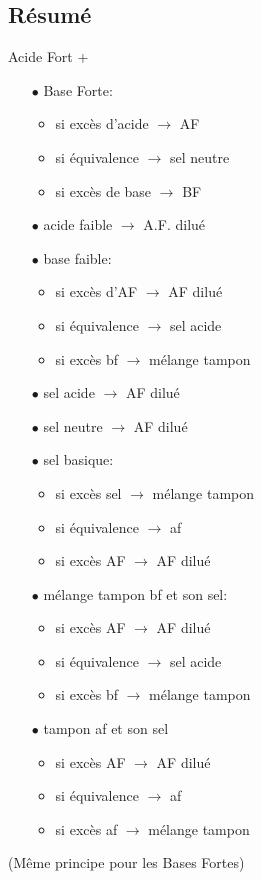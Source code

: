 \documentclass[11pt,a4paper,french]{article}
\begin{document}
\subsection{Résumé}
Acide Fort +
\begin{itemize}
\item[$\bullet$] Base Forte:
	\begin{itemize}
	\item si excès d'acide $\rightarrow$ AF
	\item si équivalence $\rightarrow$ sel neutre
	\item si excès de base $\rightarrow$ BF
	\end{itemize}
\item[$\bullet$] acide faible $\rightarrow$ A.F. dilué
\item[$\bullet$] base faible:
	\begin{itemize}
	\item si excès d'AF $\rightarrow$ AF dilué
	\item si équivalence $\rightarrow$ sel acide
	\item si excès bf $\rightarrow$ mélange tampon
	\end{itemize}
\item[$\bullet$] sel acide $\rightarrow$ AF dilué
\item[$\bullet$] sel neutre $\rightarrow$ AF dilué
\item[$\bullet$] sel basique:
	\begin{itemize}
	\item si excès sel $\rightarrow$ mélange tampon
	\item si équivalence $\rightarrow$ af
	\item si excès AF $\rightarrow$ AF dilué
	\end{itemize}
\item[$\bullet$] mélange tampon bf et son sel:
	\begin{itemize}
	\item si excès AF $\rightarrow$ AF dilué
	\item si équivalence $\rightarrow$ sel acide
	\item si excès bf $\rightarrow$ mélange tampon
	\end{itemize}
\item[$\bullet$] tampon af et son sel
	\begin{itemize}
	\item si excès AF $\rightarrow$ AF dilué
	\item si équivalence $\rightarrow$ af
	\item si excès af $\rightarrow$ mélange tampon
	\end{itemize}
\end{itemize}
(Même principe pour les Bases Fortes)
\end{document}
